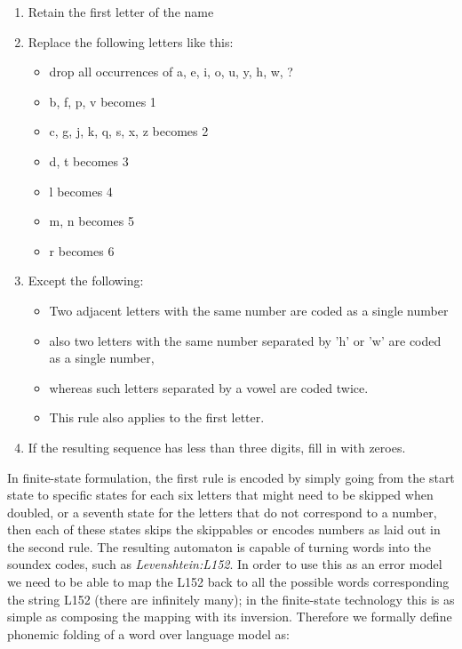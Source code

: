 \documentclass[a4paper,12pt]{article}
\begin{document}
\begin{enumerate}
    \item Retain the first letter of the name 
    \item Replace the following letters like this:\begin{itemize}
            \item drop all occurrences of a, e, i, o, u, y, h, w, ?
            \item b, f, p, v becomes 1
            \item c, g, j, k, q, s, x, z becomes 2
            \item d, t becomes 3
            \item l becomes 4
            \item m, n becomes 5
            \item r becomes 6
        \end{itemize}
    \item Except the following:\begin{itemize}
            \item Two adjacent letters with the same number are coded as a
                single number
            \item also two letters with the same number separated by 'h' or 'w'
                are coded as a single number,
            \item whereas such letters separated by a vowel are coded twice.
            \item This rule also applies to the first letter.
        \end{itemize}
    \item If the resulting sequence has less than three digits, fill in with
        zeroes.
\end{enumerate}

In finite-state formulation, the first rule is encoded by
simply going from the start state to specific states for each six letters that
might need to be skipped when doubled, or a seventh state for the letters that
do not correspond to a number, then each of these states skips the skippables
or encodes numbers as laid out in the second rule. The resulting automaton is
capable of turning words into the soundex codes, such as
\emph{Levenshtein:L152}. In order to use this as an error model we need to be
able to map the L152 back to all the possible words corresponding the string
L152 (there are infinitely many); in the finite-state technology this is as
simple as composing the mapping with its inversion. Therefore we formally
define phonemic folding of a word over language model as:
\end{document}
